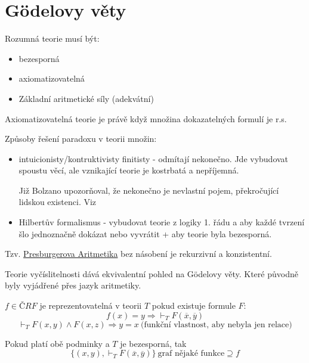 \section{\texorpdfstring{G\"{o}delovy věty}{G\"{o}delovy věty}}
\vspace{5mm}
\large

\begin{definition}
	Rozumná teorie musí být:
	\begin{itemize}
		\item bezesporná
		\item axiomatizovatelná
		\item Základní aritmetické síly (adekvátní)
	\end{itemize}
\end{definition}

\begin{definition}
	Axiomatizovatelná teorie je právě když množina dokazatelných formulí je r.s.
\end{definition}

Způsoby řešení paradoxu v teorii množin:
\begin{itemize}
	\item intuicionisty/kontruktivisty finitisty - odmítají nekonečno.
		Jde vybudovat spoustu věcí, ale vznikající teorie je kostrbatá a nepříjemná.

		Již Bolzano upozorňoval, že nekonečno je nevlastní pojem, překročující lidskou existenci. Viz ~\cite{bolzano2014paradoxes}
	\item Hilbertův formalismus - vybudovat teorie z logiky 1. řádu a aby každé tvrzení šlo jednoznačně dokázat nebo vyvrátit + aby teorie byla bezesporná.
\end{itemize}


\begin{note}
	Tzv. \href{https://en.wikipedia.org/wiki/Presburger_arithmetic}{Presburgerova Aritmetika}  bez násobení je rekurzivní a konzistentní.
\end{note}

\begin{note}
	Teorie vyčíslitelnosti dává ekvivalentní pohled na G\"{o}delovy věty. Které původně byly vyjádřené přes jazyk aritmetiky.
\end{note}

\begin{definition}[Reprezentovatelnost]
	$f \in ČRF$ je reprezentovatelná v teorii $T$ pokud existuje formule $F$:
	\[ f(x) = y \Rightarrow \vdash_T F(\overline{x}, \overline{y}) \]
	\[ \vdash_T F(x, y) \land F(x, z) \Rightarrow y = x\ \text{(funkční vlastnost, aby nebyla jen relace)} \]

	Pokud platí obě podminky a $T$ je bezesporná, tak
	\[ \{ (x, y), \vdash_T F(\overline{x}, \overline{y}) \}\ \text{graf nějaké funkce} \supseteq f \]
\end{definition}

